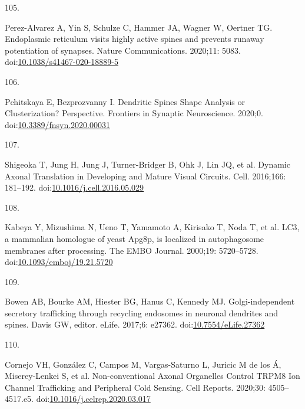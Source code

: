 \documentclass[
  12pt,
  a4paper,
]{book}
\newlength{\cslhangindent}
\newlength{\csllabelwidth}
\newlength{\cslentryspacingunit} %
\newenvironment{CSLReferences}[2] %
 {%
  \setlength{\parindent}{0pt}
  \ifodd #1
  \let\oldpar\par
  \def\par{\hangindent=\cslhangindent\oldpar}
  \fi
  \setlength{\parskip}{#2\cslentryspacingunit}
 }%
 {}
\newcommand{\CSLLeftMargin}[1]{\parbox[t]{\csllabelwidth}{#1}}
\newcommand{\CSLRightInline}[1]{\parbox[t]{\linewidth - \csllabelwidth}{#1}\break}
\begin{document}
\begin{CSLReferences}{0}{0}
\leavevmode{}%
\CSLLeftMargin{105. }%
\CSLRightInline{Perez-Alvarez A, Yin S, Schulze C, Hammer JA, Wagner W, Oertner TG. Endoplasmic reticulum visits highly active spines and prevents runaway potentiation of synapses. Nature Communications. 2020;11: 5083. doi:\href{https://doi.org/10.1038/s41467-020-18889-5}{10.1038/s41467-020-18889-5}}

\leavevmode{}%
\CSLLeftMargin{106. }%
\CSLRightInline{Pchitskaya E, Bezprozvanny I. Dendritic {Spines Shape Analysis}\textemdash{{Classification}} or {Clusterization}? {Perspective}. Frontiers in Synaptic Neuroscience. 2020;0. doi:\href{https://doi.org/10.3389/fnsyn.2020.00031}{10.3389/fnsyn.2020.00031}}

\leavevmode{}%
\CSLLeftMargin{107. }%
\CSLRightInline{Shigeoka T, Jung H, Jung J, Turner-Bridger B, Ohk J, Lin JQ, et al. Dynamic {Axonal Translation} in {Developing} and {Mature Visual Circuits}. Cell. 2016;166: 181--192. doi:\href{https://doi.org/10.1016/j.cell.2016.05.029}{10.1016/j.cell.2016.05.029}}

\leavevmode{}%
\CSLLeftMargin{108. }%
\CSLRightInline{Kabeya Y, Mizushima N, Ueno T, Yamamoto A, Kirisako T, Noda T, et al. {LC3}, a mammalian homologue of yeast {Apg8p}, is localized in autophagosome membranes after processing. The EMBO Journal. 2000;19: 5720--5728. doi:\href{https://doi.org/10.1093/emboj/19.21.5720}{10.1093/emboj/19.21.5720}}

\leavevmode{}%
\CSLLeftMargin{109. }%
\CSLRightInline{Bowen AB, Bourke AM, Hiester BG, Hanus C, Kennedy MJ. Golgi-independent secretory trafficking through recycling endosomes in neuronal dendrites and spines. Davis GW, editor. eLife. 2017;6: e27362. doi:\href{https://doi.org/10.7554/eLife.27362}{10.7554/eLife.27362}}

\leavevmode{}%
\CSLLeftMargin{110. }%
\CSLRightInline{Cornejo VH, González C, Campos M, Vargas-Saturno L, Juricic M de los Á, Miserey-Lenkei S, et al. Non-conventional {Axonal Organelles Control TRPM8 Ion Channel Trafficking} and {Peripheral Cold Sensing}. Cell Reports. 2020;30: 4505--4517.e5. doi:\href{https://doi.org/10.1016/j.celrep.2020.03.017}{10.1016/j.celrep.2020.03.017}}


\end{CSLReferences}
\end{document}
